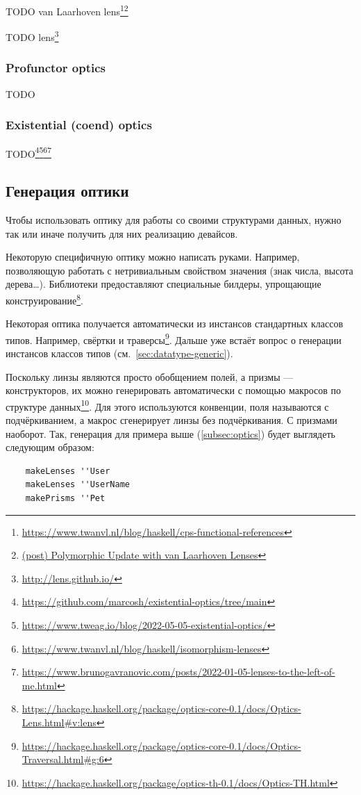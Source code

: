 TODO van Laarhoven lens\footnote{\url{https://www.twanvl.nl/blog/haskell/cps-functional-references}}\footnote{\href{http://r6.ca/blog/20120623T104901Z.html}{(post) Polymorphic Update with van Laarhoven Lenses}} %

TODO lens\footnote{\url{http://lens.github.io/}} %


\subsubsection{Profunctor optics}

TODO %


\subsubsection{Existential (coend) optics}

TODO\footnote{\url{https://github.com/marcosh/existential-optics/tree/main}}\footnote{\url{https://www.tweag.io/blog/2022-05-05-existential-optics/}}\footnote{\url{https://www.twanvl.nl/blog/haskell/isomorphism-lenses}}\footnote{\url{https://www.brunogavranovic.com/posts/2022-01-05-lenses-to-the-left-of-me.html}} %


\subsection{Генерация оптики}

Чтобы использовать оптику для работы со своими структурами данных, нужно так или иначе получить для них реализацию девайсов.

Некоторую специфичную оптику можно написать руками.
Например, позволяющую работать с нетривиальным свойством значения (знак числа, высота дерева\ldots).
Библиотеки предоставляют специальные билдеры, упрощающие конструирование\footnote{\url{https://hackage.haskell.org/package/optics-core-0.1/docs/Optics-Lens.html\#v:lens}}.

Некоторая оптика получается автоматически из инстансов стандартных классов типов.
Например, свёртки и траверсы\footnote{\url{https://hackage.haskell.org/package/optics-core-0.1/docs/Optics-Traversal.html\#g:6}}.
Дальше уже встаёт вопрос о генерации инстансов классов типов (см.~\ref{sec:datatype-generic}).

Поскольку линзы являются просто обобщением полей, а призмы --- конструкторов, их можно генерировать автоматически с помощью макросов по структуре данных\footnote{\url{https://hackage.haskell.org/package/optics-th-0.1/docs/Optics-TH.html}}.
Для этого используются конвенции, поля называются с подчёркиванием, а макрос сгенерирует линзы без подчёркивания.
С призмами наоборот.
Так, генерация для примера выше (\ref{subsec:optics}) будет выглядеть следующим образом:
\begin{verbatim}
    makeLenses ''User
    makeLenses ''UserName
    makePrisms ''Pet
\end{verbatim}

